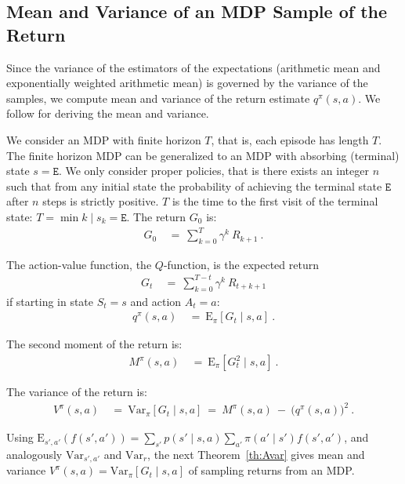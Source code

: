 \documentclass{article}
\newcommand\EXP{\mathbf{\mathrm{E}}}
\newcommand\VAR{\mathbf{\mathrm{Var}}}
\begin{document}
\begin{appendices}
\subsection{Mean and Variance of an MDP Sample of the Return}
\label{sec:Abias_variance_sample}

Since the variance of the estimators of the expectations (arithmetic mean and 
exponentially weighted arithmetic mean) is governed by the variance of the samples, 
we compute mean and variance of the return estimate $q^\pi(s,a)$. 
We follow
\cite{Sobel:82,Tamar:12,Tamar:16} for deriving the mean and variance.

We consider an MDP with finite horizon $T$, 
that is, each episode has length $T$.
The finite horizon MDP can be generalized to an MDP 
with absorbing (terminal) state $s=\mathtt{E}$.
We only consider proper policies, that is there exists an integer $n$
such that from any initial state the probability of achieving
the terminal state $\mathtt{E}$ after $n$ steps is strictly positive.
$T$ is the time to the
first visit of the terminal state: $T=\min{k \mid s_k=\mathtt{E}}$.
The return $G_0$ is:
\begin{align}
   G_0 \ &= \ \sum_{k=0}^{T}  \gamma^k \ R_{k+1} \ .  
\end{align}

The action-value function, the $Q$-function, is the expected return
\begin{align}
  G_t \ &= \ \sum_{k=0}^{T-t} \gamma^k \  R_{t+k+1}  
\end{align}
if starting in state $S_t=s$ and action $A_t=a$:
\begin{align}
  q^{\pi}(s,a) \ &= \ \EXP_{\pi} \left[ G_t \mid s, a \right] \ .  
\end{align}

The second moment of the return is:
\begin{align}
  M^{\pi}(s,a) \ &= \ \EXP_{\pi} \left[ G_t^2 \mid s, a
  \right] \ .  
\end{align}

The variance of the return is:
\begin{align}
  V^{\pi}(s,a) \ &= \ \VAR_{\pi} \left[ G_t \mid s, a
  \right] \ = \ M^{\pi}(s,a) \ - \  \big( q^{\pi}(s,a) \big)^2 \ .  
\end{align}


Using  $\EXP_{s',a'}(f(s',a'))= \sum_{s'} p(s'\mid s,a) \sum_{a'} \pi(a' \mid
s') f(s',a')$, and analogously $\VAR_{s',a'}$ and $\VAR_r$, the
next Theorem~\ref{th:Avar} gives mean and variance
$V^{\pi}(s,a) =  \VAR_{\pi} \left[ G_t \mid s, a \right]$
of sampling returns from an MDP.



\end{appendices}
\end{document}
